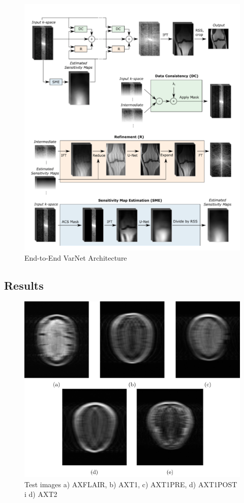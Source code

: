 \documentclass[10pt,a4paper]{article}
\begin{document}
\begin{figure}[H]
\centering
\includegraphics[scale=0.5]{images/e2e-varnet-architecture.png}
\caption{End-to-End VarNet Architecture \cite{sriram2020endtoend}}
\end{figure}

\subsection{Results}

\begin{figure}[H]
\centering
\includegraphics[width=400pt]{./images/test-images.png}
\caption{Test images a) AXFLAIR, b) AXT1, c) AXT1PRE, d) AXT1POST i d) AXT2}
\end{figure}
\end{document}
